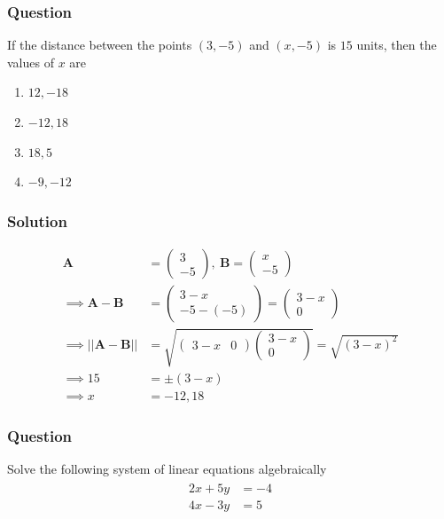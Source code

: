 \documentclass{beamer}
\providecommand{\brak}[1]{\ensuremath{\left(#1\right)}}
\theoremstyle{remark}
\newcommand{\myvec}[1]{\ensuremath{\begin{pmatrix}#1\end{pmatrix}}}
\let\vec\mathbf
\begin{document}
\begin{frame}
\frametitle{Question }
If the distance between the points $\brak{3,-5}$ and $\brak{x,-5}$ is $15$ units, then the values of $x$ are
\begin{enumerate}
\item  $12,-18$
\item  $-12,18$
\item  $18,5$
\item  $-9,-12$
\end{enumerate}
\end{frame}
\begin{frame}
\frametitle{Solution}
\begin{align}
	\vec{A} &=
    \myvec{
3 \\
-5 
},\
\vec{B} =
    \myvec{
x \\
-5 
}\\
\implies \vec{A}-\vec{B} &= \myvec{
        3-x\\
        -5 -\brak{-5}
    } = \myvec{
        3-x\\
        0
    }
    \\
\implies      \lvert\lvert \vec{A}-\vec{B} \rvert\rvert 
&= \sqrt{\myvec{
        3-x & 0
    }
\myvec{
        3-x\\
        0
    }}
     = \sqrt{\brak{3-x}^2}\\
\implies  15 &= \pm\brak{3-x}\\
 \implies  x &= -12,18
\end{align}
\end{frame}
%
\begin{frame}
\frametitle{Question }
Solve the following system of linear equations algebraically
\begin{align}
\label{eq:8}
\begin{split}
	2x+5y&=-4
\\
	4x-3y&=5
\end{split}
\end{align}
\end{frame}
\end{document}
